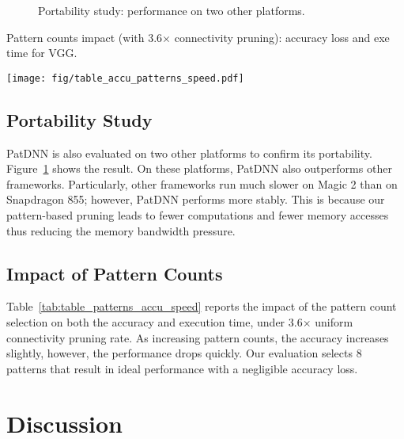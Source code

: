 \documentclass[sigplan,screen]{acmart}
\begin{document}
\begin{figure}[t]
    \centering
        \caption{Portability study: performance on two other platforms.}
    \label{fig:eva_portability}
\end{figure}

\begin{table}[t]
\vspace{-5mm}
\caption{Pattern counts impact (with 3.6$\times$ connectivity pruning): accuracy loss and exe time for VGG.}
\label{tab:table_patterns_accu_speed}
\centering
\texttt{[image: fig/table\_accu\_patterns\_speed.pdf]}
\vspace{5mm}
\end{table}

\subsection{Portability Study}

PatDNN is also evaluated on two other platforms to confirm its portability. Figure~\ref{fig:eva_portability} shows the result. On these platforms, PatDNN also outperforms other frameworks. Particularly, other frameworks run much slower on Magic 2 than on Snapdragon 855; however, PatDNN performs more stably.
This is because our pattern-based pruning leads to fewer computations and fewer memory accesses thus reducing the memory bandwidth pressure.






\subsection{Impact of Pattern Counts}



Table~\ref{tab:table_patterns_accu_speed} reports the impact of the pattern count selection on both the accuracy and execution time, under 3.6$\times$ uniform connectivity pruning rate. As increasing pattern counts, the accuracy increases slightly, however, the performance drops quickly. Our evaluation selects 8 patterns that result in ideal performance with a negligible accuracy loss.     \section{Discussion}
\end{document}
